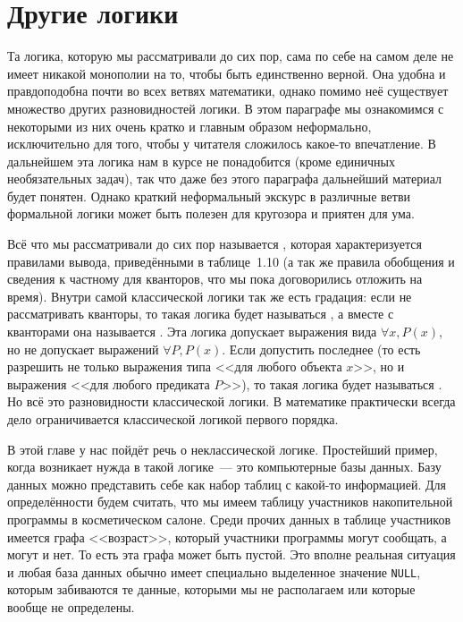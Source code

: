 \section{Другие логики}

Та логика, которую мы рассматривали до сих пор, сама по себе на самом деле не имеет никакой монополии на то, чтобы быть единственно верной. Она удобна и правдоподобна почти во всех ветвях математики, однако помимо неё существует множество других разновидностей логики. В этом параграфе мы ознакомимся с некоторыми из них очень кратко и главным образом неформально, исключительно для того, чтобы у читателя сложилось какое-то впечатление. В дальнейшем эта логика нам в курсе не понадобится (кроме единичных необязательных задач), так что даже без этого параграфа дальнейший материал будет понятен. Однако краткий неформальный экскурс в различные ветви формальной логики может быть полезен для кругозора и приятен для ума.

Всё что мы рассматривали до сих пор называется , которая характеризуется правилами вывода, приведёнными в таблице~1.10 (а так же правила обобщения и сведения к частному для кванторов, что мы пока договорились отложить на время). Внутри самой классической логики так же есть градация: если не рассматривать кванторы, то такая логика будет называться , а вместе с кванторами она называется . Эта логика допускает выражения вида $\forall x, P(x)$, но не допускает выражений $\forall P, P(x)$. Если допустить последнее (то есть разрешить не только выражения типа <<для любого объекта $x$>>, но и выражения <<для любого предиката $P$>>), то такая логика будет называться . Но всё это разновидности классической логики. В математике практически всегда дело ограничивается классической логикой первого порядка.

В этой главе у нас пойдёт речь о неклассической логике. Простейший пример, когда возникает нужда в такой логике~--- это компьютерные базы данных. Базу данных можно представить себе как набор таблиц с какой-то информацией. Для определённости будем считать, что мы имеем таблицу участников накопительной программы в косметическом салоне. Среди прочих данных в таблице участников имеется графа <<возраст>>, который участники программы могут сообщать, а могут и нет. То есть эта графа может быть пустой. Это вполне реальная ситуация и любая база данных обычно имеет специально выделенное значение \texttt{NULL}, которым забиваются те данные, которыми мы не располагаем или которые вообще не определены.

